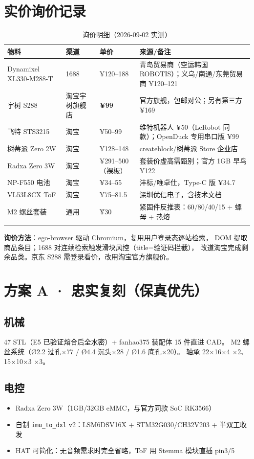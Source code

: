 \documentclass[11pt,a4paper]{ctexart}
\begin{document}
\section{实价询价记录}

\begin{longtable}{@{}L{4.6cm}L{2.6cm}L{2.2cm}L{5.2cm}@{}}
\toprule
{} \textbf{物料} & \textbf{渠道} & \textbf{单价} & \textbf{来源/备注}\\
\midrule
\endhead
Dynamixel XL330-M288-T & 1688 & ¥120--188 & 青岛贸易商（空运韩国 ROBOTIS）；义乌/南通/东莞贸易商 ¥120--121\\
宇树 S288 & 淘宝宇树旗舰店 & \textbf{¥99} & 官方旗舰，包邮对公；另有第三方 ¥169\\
飞特 STS3215 & 淘宝 & ¥50--99 & 维特机器人 ¥50（LeRobot 同款）；OpenDuck 专用串口版 ¥99\\
树莓派 Zero 2W & 淘宝 & ¥128--148 & createblock/树莓派 Store 企业店\\
Radxa Zero 3W & 淘宝 & ¥291--500（裸板） & 套装价虚高需甄别；官方 1GB 早鸟 ¥122\\
NP-F550 电池 & 淘宝 & ¥34--55 & 沣标/唯卓仕，Type-C 版 ¥34.7\\
VL53L8CX ToF & 淘宝 & ¥75--81.5 & 深圳优信电子，含技术文档\\
M2 螺丝套装 & 通用 & \~¥30 & 紧固件反推表：60/80/40/15 + 螺母 + 热熔\\
\bottomrule
\caption{询价明细（2026-09-02 实测）}
\end{longtable}

\textbf{询价方法}：ego-browser 驱动 Chromium，复用用户登录态逐站检索，
DOM 提取商品条目；1688 对连续检索触发滑块风控（title=验证码拦截），
改道淘宝完成剩余品类。京东 S288 需登录看价，改用淘宝官方旗舰价。

\section{方案 A · 忠实复刻（保真优先）}
\subsection{机械}
47 STL（E5 已验证熔合后全水密）+ fanhao375 装配体 15 件直进 CAD。
M2 螺丝系统（Ø2.2 过孔×77 / Ø4.4 沉头×28 / Ø1.6 底孔×20）。
轴承 22×16×4 ×2、15×10×3 ×3。
\subsection{电控}
\begin{itemize}\itemsep0pt
\item Radxa Zero 3W（1GB/32GB eMMC，与官方同款 SoC RK3566）
\item 自制 \texttt{imu\_to\_dxl} v2：LSM6DSV16X + STM32G030/CH32V203 + 半双工收发
\item HAT 可简化：无音频需求时完全省略，ToF 用 Stemma 模块直插 pin3/5
\end{itemize}
\end{document}
